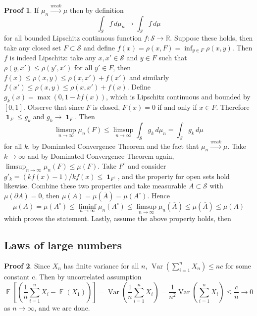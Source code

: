 \documentclass[hidelinks,11pt]{article}
\theoremstyle{definition}
\theoremstyle{dotless}
\newtheorem{prop}{Proof}[section]
\theoremstyle{remark}
\DeclareMathOperator{\Var}{Var}
\DeclareMathOperator{\E}{\mathbb{E}}
\DeclareMathOperator{\1}{\mathbf{1}}
\begin{document}
\begin{prop}
If $\mu_n\xrightarrow{weak}\mu$ then by definition
\[\int_\mathcal{S}f\,d\mu_n\to\int_\mathcal{S}f\,d\mu\]
for all bounded Lipschitz continuous function $f:\mathcal{S}\to\mathbb{R}$.\medbreak
Suppose these holds, then take any closed set $F\subset\mathcal{S}$ and define $f(x)=\rho(x,F)=\inf_{y\in F}\rho(x,y)$. Then $f$ is indeed Lipschitz: take any $x,x'\in\mathcal{S}$ and $y\in F$ such that $\rho(y,x')\leq\rho(y',x')$ for all $y'\in F$, then $f(x)\leq\rho(x,y)\leq\rho(x,x')+f(x')$ and similarly $f(x')\leq\rho(x,y)\leq\rho(x,x')+f(x)$. Define $g_k(x)=\max(0,1-kf(x))$, which is Lipschitz continuous and bounded by $[0,1]$. Observe that since $F$ is closed, $F(x)=0$ if and only if $x\in F$. Therefore $\1_F\leq g_k$ and $g_k\to\1_F$. Then
\[\limsup_{n\to\infty}\mu_n(F)\leq\limsup_{n\to\infty}\int_\mathcal{S}g_k\,d\mu_n=\int_\mathcal{S}g_k\,d\mu\]
for all $k$, by Dominated Convergence Theorem and the fact that $\mu_n\xrightarrow{weak}\mu$. Take $k\to\infty$ and by Dominated Convergence Theorem again, $\limsup_{n\to\infty}\mu_n(F)\leq\mu(F)$. Take $F^c$ and consider $g'_k=(kf(x)-1)/kf(x)\leq\1_{F^c}$, and the property for open sets hold likewise.\medbreak
Combine these two properties and take measurable $A\subset\mathcal{S}$ with $\mu(\partial A)=0$, then $\mu(A)=\mu(\overline{A})=\mu(A^\circ)$. Hence
\[\mu(A)=\mu(A^\circ)\leq\liminf_{n\to\infty}\mu_n(A^\circ)\leq\limsup_{n\to\infty}\mu_n(\overline{A})\leq\mu(\overline{A})\leq\mu(A)\]
which proves the statement.\medbreak
Lastly, assume the above property holds, then
\end{prop}

\subsection{Laws of large numbers}

\begin{prop}
Since $X_n$ has finite variance for all $n$, $\Var(\sum_{i=1}^nX_n)\leq nc$ for some constant c. Then by uncorrelated assumption
\[\E\left[\left(\frac{1}{n}\sum_{i=1}^nX_i-\E(X_1)\right)\right]=\Var\left(\frac{1}{n}\sum_{i=1}^nX_i\right)=\frac{1}{n^2}\Var\left(\sum_{i=1}^nX_i\right)\leq\frac{c}{n}\to0\]
as $n\to\infty$, and we are done.
\end{prop}
\end{document}
